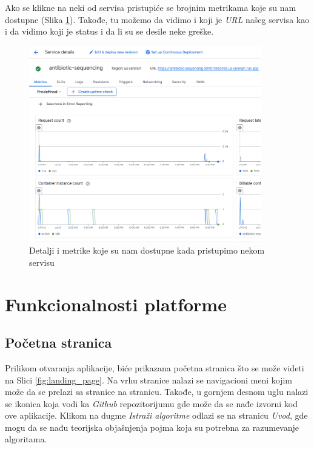 \documentclass[12pt,oneside]{memoir}
\begin{document}
Ako se klikne na neki od servisa pristupiće se brojnim metrikama koje su nam dostupne (Slika \ref{fig:gcr_services_details}). Takođe, tu možemo da vidimo i koji je \emph{URL} našeg servisa kao i da vidimo koji je status i da li su se desile neke greške.

\begin{figure}[h]
\centering
\includegraphics[width=0.9\textwidth]{images/gcr_services_details.png}
\caption{Detalji i metrike koje su nam dostupne kada pristupimo nekom servisu}
\label{fig:gcr_services_details}
\end{figure}


\section{Funkcionalnosti platforme}

\subsection{Početna stranica}

Prilikom otvaranja aplikacije, biće prikazana početna stranica što se može videti na Slici \ref{fig:landing_page}. Na vrhu stranice nalazi se navigacioni meni kojim može da se prelazi sa stranice na stranicu. Takođe, u gornjem desnom uglu nalazi se ikonica koja vodi ka \emph{Github} repozitorijumu gde može da se nađe izvorni kod ove aplikacije.
Klikom na dugme \emph{Istraži algoritme} odlazi se na stranicu \emph{Uvod}, gde mogu da se nađu teorijska objašnjenja pojma koja su potrebna za razumevanje algoritama.
\end{document}
